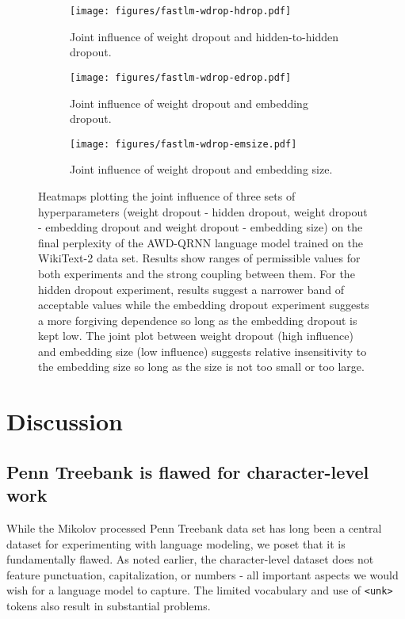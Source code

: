 \documentclass{article}
\begin{document}
\begin{figure*}
    \centering
    \begin{subfigure}[b]{0.3\linewidth}
        \texttt{[image: figures/fastlm-wdrop-hdrop.pdf]}
        \centering
        \caption{Joint influence of weight dropout and hidden-to-hidden dropout.}
        \label{fig:gull}
    \end{subfigure}
    \qquad
\begin{subfigure}[b]{0.3\linewidth}
\texttt{[image: figures/fastlm-wdrop-edrop.pdf]}
        \centering
        \caption{Joint influence of weight dropout and embedding dropout.}        
        \label{fig:tiger}
    \end{subfigure}
    \qquad
\begin{subfigure}[b]{0.3\linewidth}
\texttt{[image: figures/fastlm-wdrop-emsize.pdf]}
        \centering
        \caption{Joint influence of weight dropout and embedding size.}        
        \label{fig:tiger}
    \end{subfigure}
    
    \caption{Heatmaps plotting the joint influence of three sets of hyperparameters (weight dropout - hidden dropout, weight dropout - embedding dropout and  weight dropout - embedding size) on the final perplexity of the AWD-QRNN language model trained on the WikiText-2 data set. Results show ranges of permissible values for both experiments and the strong coupling between them. For the hidden dropout experiment, results suggest a narrower band of acceptable values while the embedding dropout experiment suggests a more forgiving dependence so long as the embedding dropout is kept low. The joint plot between weight dropout (high influence) and embedding size (low influence) suggests relative insensitivity to the embedding size so long as the size is not too small or too large.\label{fig:slice}}
\end{figure*}
\section{Discussion}

\subsection{Penn Treebank is flawed for character-level work}

While the Mikolov processed Penn Treebank data set has long been a central dataset for experimenting with language modeling, we poset that it is fundamentally flawed.
As noted earlier, the character-level dataset does not feature punctuation, capitalization, or numbers - all important aspects we would wish for a language model to capture. 
The limited vocabulary and use of \verb+<unk>+ tokens also result in substantial problems.
\end{document}
